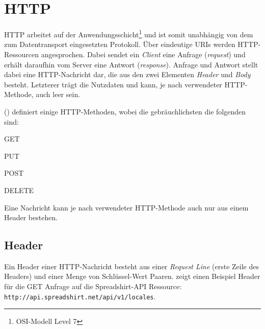 \section{HTTP}
\label{sec:http}


HTTP arbeitet auf der Anwendungsschicht\footnote{OSI-Modell Level 7} und ist somit unabhängig von dem zum Datentransport eingesetzten Protokoll. 
Über eindeutige \glspl{URI} werden HTTP-Ressourcen angesprochen. Dabei sendet ein \emph{Client} eine Anfrage (\emph{request}) und erhält daraufhin vom Server eine Antwort (\emph{response}). Anfrage und Antwort stellt dabei eine HTTP-Nachricht dar, die aus den zwei Elementen \emph{Header} und \emph{Body} besteht. Letzterer trägt die Nutzdaten und kann, je nach verwendeter HTTP-Methode, auch leer sein.

 (\cite{rfc2616}) definiert einige HTTP-Methoden, wobei die gebräuchlichsten die folgenden sind:
\begin{compactitem}
    \item GET
    \item PUT
    \item POST
    \item DELETE
\end{compactitem}

Eine Nachricht kann je nach verwendeter HTTP-Methode auch nur aus einem Header bestehen.

\subsection{Header}
\label{sec:http-header}

Ein Header einer HTTP-Nachricht besteht aus einer \emph{Request Line} (erste Zeile des Headers) und einer Menge von Schlüssel-Wert Paaren.  zeigt einen Beispiel Header für die GET Anfrage auf die Spreadshirt-API Ressource:\\
\texttt{http://api.spreadshirt.net/api/v1/locales}.

